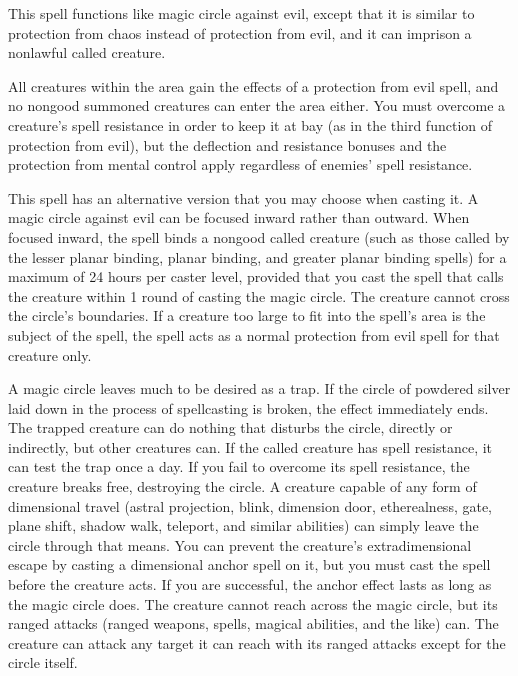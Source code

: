\begin{multicols}{2}
\begin{small}
\noindent This spell functions like magic circle against evil, except that it is similar to protection from chaos instead of protection from evil, and it can imprison a nonlawful called creature.

\noindent All creatures within the area gain the effects of a protection from evil spell, and no nongood summoned creatures can enter the area either. You must overcome a creature's spell resistance in order to keep it at bay (as in the third function of protection from evil), but the deflection and resistance bonuses and the protection from mental control apply regardless of enemies' spell resistance.

\smallskip\noindent This spell has an alternative version that you may choose when casting it. A magic circle against evil can be focused inward rather than outward. When focused inward, the spell binds a nongood called creature (such as those called by the lesser planar binding, planar binding, and greater planar binding spells) for a maximum of 24 hours per caster level, provided that you cast the spell that calls the creature within 1 round of casting the magic circle. The creature cannot cross the circle's boundaries. If a creature too large to fit into the spell's area is the subject of the spell, the spell acts as a normal protection from evil spell for that creature only.

\smallskip\noindent A magic circle leaves much to be desired as a trap. If the circle of powdered silver laid down in the process of spellcasting is broken, the effect immediately ends. The trapped creature can do nothing that disturbs the circle, directly or indirectly, but other creatures can. If the called creature has spell resistance, it can test the trap once a day. If you fail to overcome its spell resistance, the creature breaks free, destroying the circle. A creature capable of any form of dimensional travel (astral projection, blink, dimension door, etherealness, gate, plane shift, shadow walk, teleport, and similar abilities) can simply leave the circle through that means. You can prevent the creature's extradimensional escape by casting a dimensional anchor spell on it, but you must cast the spell before the creature acts. If you are successful, the anchor effect lasts as long as the magic circle does. The creature cannot reach across the magic circle, but its ranged attacks (ranged weapons, spells, magical abilities, and the like) can. The creature can attack any target it can reach with its ranged attacks except for the circle itself.


\end{small}
\end{multicols}
